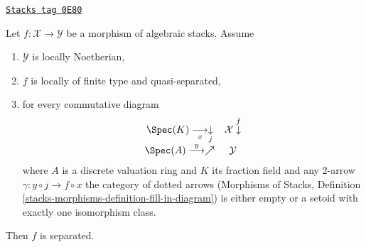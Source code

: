 \begin{lemma}
\label{stacks-more-morphisms-lemma-check-separated-dvr}
\href{https://stacks.math.columbia.edu/tag/0E80}{\texttt{Stacks tag 0E80}}

Let $f : \mathcal{X} \to \mathcal{Y}$ be a morphism of algebraic stacks. Assume
\begin{enumerate}
\item $\mathcal{Y}$ is locally Noetherian,
\item $f$ is locally of finite type and quasi-separated,
\item for every commutative diagram
$$
\begin{array}{cc}\Spec(K) \underset{x}{\longrightarrow}\underset{j}{\downarrow} & \mathcal{X} \overset{f}{\downarrow} \\ \Spec(A) \overset{y}{\longrightarrow}\nearrow & \mathcal{Y}\end{array}
$$
where $A$ is a discrete valuation ring and $K$ its fraction field
and any $2$-arrow $\gamma : y \circ j \to f \circ x$ the category
of dotted arrows (Morphisms of Stacks, Definition
\ref{stacks-morphisms-definition-fill-in-diagram})
is either empty or a setoid with exactly one isomorphism class.
\end{enumerate}
Then $f$ is separated.
\end{lemma}

